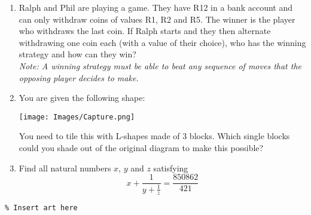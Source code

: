 \begin{enumerate}[1.]
\item Ralph and Phil are playing a game. They have R12 in a bank account and can only withdraw coins of values R1, R2 and R5. The winner is the player who withdraws the last coin. If Ralph starts and they then alternate withdrawing one coin each (with a value of their choice), who has the winning strategy and how can they win?\\
\textit{Note: A winning strategy must be able to beat any sequence of moves that the opposing player decides to make.}


\item You are given the following shape: %
	\begin{center}
	\texttt{[image: Images/Capture.png]}	
	\end{center}
	You need to tile this with L-shapes made of 3 blocks. Which single blocks could you shade out of the original diagram to make this possible?


\item %
Find all natural numbers $x$, $y$ and $z$ satisfying 
$$x + \frac{1}{y + \frac{1}{z}} = \frac{850862}{421}$$


\end{enumerate}


\vfill
\begin{center} \begin{verbatim}
% Insert art here
\end{verbatim} \end{center}



